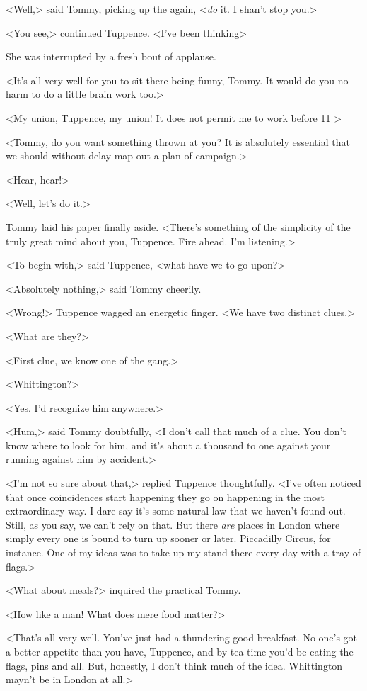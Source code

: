 <Well,> said Tommy, picking up the  again, <\emph{do} it. I shan't stop you.>

<You see,> continued Tuppence. <I've been thinking\longdash>

She was interrupted by a fresh bout of applause.

<It's all very well for you to sit there being funny, Tommy. It would do you no harm to do a little brain work too.>

<My union, Tuppence, my union! It does not permit me to work before 11 >

<Tommy, do you want something thrown at you? It is absolutely essential that we should without delay map out a plan of campaign.>

<Hear, hear!>

<Well, let's do it.>

Tommy laid his paper finally aside. <There's something of the simplicity of the truly great mind about you, Tuppence. Fire ahead. I'm listening.>

<To begin with,> said Tuppence, <what have we to go upon?>

<Absolutely nothing,> said Tommy cheerily.

<Wrong!> Tuppence wagged an energetic finger. <We have two distinct clues.>

<What are they?>

<First clue, we know one of the gang.>

<Whittington?>

<Yes. I'd recognize him anywhere.>

<Hum,> said Tommy doubtfully, <I don't call that much of a clue. You don't know where to look for him, and it's about a thousand to one against your running against him by accident.>

<I'm not so sure about that,> replied Tuppence thoughtfully. <I've often noticed that once coincidences start happening they go on happening in the most extraordinary way. I dare say it's some natural law that we haven't found out. Still, as you say, we can't rely on that. But there \emph{are} places in London where simply every one is bound to turn up sooner or later. Piccadilly Circus, for instance. One of my ideas was to take up my stand there every day with a tray of flags.>

<What about meals?> inquired the practical Tommy.

<How like a man! What does mere food matter?>

<That's all very well. You've just had a thundering good breakfast. No one's got a better appetite than you have, Tuppence, and by tea-time you'd be eating the flags, pins and all. But, honestly, I don't think much of the idea. Whittington mayn't be in London at all.>

